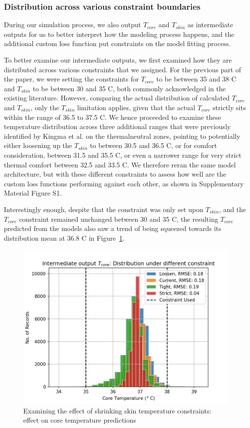 \subsubsection{Distribution across various constraint boundaries}
During our simulation process, we also output $T_{core}$ and  $T_{skin}$ as intermediate outputs for us to better interpret how the modeling process happens, and the additional custom loss function put constraints on the model fitting process.

To better examine our intermediate outputs, we first examined how they are distributed across various constraints that we assigned. For the previous part of the paper, we were setting the constraints for $T_{core}$ to be between 35 and 38 \textdegree{}C and $T_{skin}$ to be between 30 and 35 \textdegree{}C, both commonly acknowledged in the existing literature. However, comparing the actual distribution of calculated $T_{core}$ and  $T_{skin}$, only the $T_{skin}$ limitation applies, given that the actual $T_{core}$ strictly sits within the range of 36.5 to 37.5 \textdegree{}C. We hence proceeded to examine these temperature distribution across three additional ranges that were previously identified by Kingma et al.\cite{kingmaClassicThermoneutralZone2014} on the thermalneutral zones, pointing to potentially either loosening up the $T_{skin}$ to between 30.5 and 36.5 \textdegree{}C, or for comfort consideration, between 31.5 and 35.5 \textdegree{}C, or even a narrower range for very strict thermal comfort between 32.5 and 33.5 \textdegree{}C. We therefore reran the same model architecture, but with these different constraints to assess how well are the custom loss functions performing against each other, as shown in Supplementary Material Figure S1.

Interestingly enough, despite that the constraint was only set upon $T_{skin}$, and the $T_{core}$ constraint remained unchanged between 30 and 35 \textdegree{}C, the resulting $T_{core}$ predicted from the models also saw a trend of being squeezed towards its distribution mean at 36.8 \textdegree{}C in Figure~\ref{fig:squeeze-core}.

\begin{figure}[htbp]
    \centering
    \includegraphics[width=0.65\linewidth]{figures/Squeezed.png}
    \caption{Examining the effect of shrinking skin temperature constraints: effect on core temperature predictions}
    \label{fig:squeeze-core}
\end{figure}

